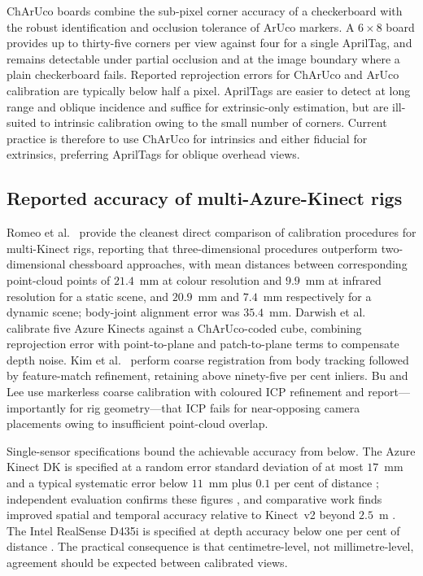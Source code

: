 ChArUco boards combine the sub-pixel corner accuracy of a checkerboard with the
robust identification and occlusion tolerance of ArUco markers. A $6\times8$
board provides up to thirty-five corners per view against four for a single
AprilTag, and remains detectable under partial occlusion and at the image
boundary where a plain checkerboard fails. Reported reprojection errors for
ChArUco and ArUco calibration are typically below half a pixel. AprilTags are
easier to detect at long range and oblique incidence and suffice for
extrinsic-only estimation, but are ill-suited to intrinsic calibration owing to
the small number of corners. Current practice is therefore to use ChArUco for
intrinsics and either fiducial for extrinsics, preferring AprilTags for oblique
overhead views.

\subsection{Reported accuracy of multi-Azure-Kinect rigs}

Romeo et al.\ \cite{romeo} provide the cleanest direct comparison of calibration
procedures for multi-Kinect rigs, reporting that three-dimensional procedures
outperform two-dimensional chessboard approaches, with mean distances between
corresponding point-cloud points of $21.4$~mm at colour resolution and
$9.9$~mm at infrared resolution for a static scene, and $20.9$~mm and $7.4$~mm
respectively for a dynamic scene; body-joint alignment error was $35.4$~mm.
Darwish et al.\ \cite{darwish} calibrate five Azure Kinects against a
ChArUco-coded cube, combining reprojection error with point-to-plane and
patch-to-plane terms to compensate depth noise. Kim et al.\ \cite{kimcal}
perform coarse registration from body tracking followed by feature-match
refinement, retaining above ninety-five per cent inliers. Bu and Lee
\cite{bulee} use markerless coarse calibration with coloured ICP refinement and
report---importantly for rig geometry---that ICP fails for near-opposing camera
placements owing to insufficient point-cloud overlap.

Single-sensor specifications bound the achievable accuracy from below. The
Azure Kinect DK is specified at a random error standard deviation of at most
$17$~mm and a typical systematic error below $11$~mm plus $0.1$ per cent of
distance \cite{mskinect}; independent evaluation confirms these figures
\cite{tolgyessy}, and comparative work finds improved spatial and temporal
accuracy relative to Kinect~v2 beyond $2.5$~m \cite{kurillo}. The Intel
RealSense D435i is specified at depth accuracy below one per cent of distance
\cite{intel}. The practical consequence is that centimetre-level, not
millimetre-level, agreement should be expected between calibrated views.

